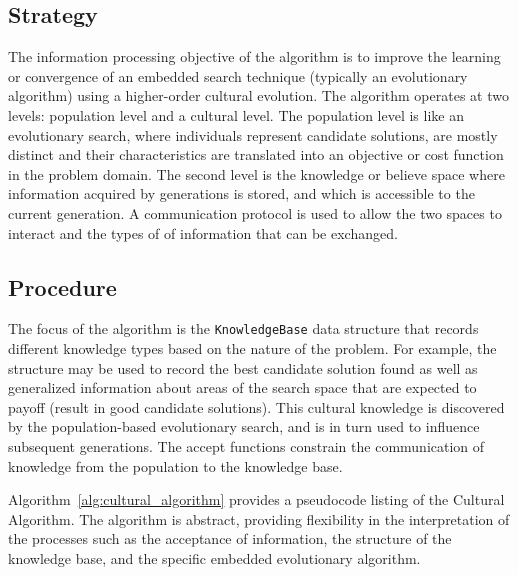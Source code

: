 \subsection{Strategy}
The information processing objective of the algorithm is to improve the learning or convergence of an embedded search technique (typically an evolutionary algorithm) using a higher-order cultural evolution. 
The algorithm operates at two levels: population level and a cultural level. The population level is like an evolutionary search, where individuals represent candidate solutions, are mostly distinct and their characteristics are translated into an objective or cost function in the problem domain. The second level is the knowledge or believe space where information acquired by generations  is stored, and which is accessible to the current generation. A communication protocol is used to allow the two spaces to interact and the types of of information that can be exchanged.

\subsection{Procedure}
The focus of the algorithm is the \texttt{KnowledgeBase} data structure that records different knowledge types based on the nature of the problem. For example, the structure may be used to record the best candidate solution found as well as generalized information about areas of the search space that are expected to payoff (result in good candidate solutions). This cultural knowledge is discovered by the population-based evolutionary search, and is in turn used to influence subsequent generations. The accept functions constrain the communication of knowledge from the population to the knowledge base.

Algorithm~\ref{alg:cultural_algorithm} provides a pseudocode listing of the Cultural Algorithm. The algorithm is abstract, providing flexibility in the interpretation of the processes such as the acceptance of information, the structure of the knowledge base, and the specific embedded evolutionary algorithm.


